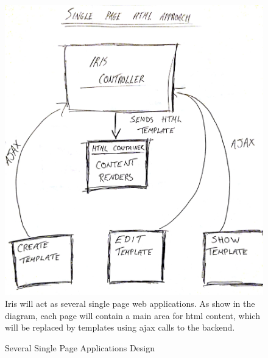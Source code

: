 \documentclass[12pt,a4paper,titlepage]{report}
\begin{document}
\begin{figure}[H]
\begin{tcolorbox}
\includegraphics[width=\textwidth,height=\textheight,keepaspectratio]{single_html_container}
Iris will act as several single page web applications. As show in the diagram, each page will contain a main area for html content, which will be replaced by templates using ajax calls to the backend.
\end{tcolorbox}
\caption{Several Single Page Applications Design}
\end{figure}

\nocite{*}
\printbibliography

\pagebreak
\end{document}
